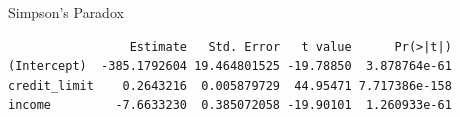 \documentclass[
  ignorenonframetext,
]{beamer}
\newenvironment{Shaded}{\begin{snugshade}}{\end{snugshade}}
\newcommand{\AttributeTok}[1]{\textcolor[rgb]{0.13,0.29,0.53}{#1}}
\newcommand{\FunctionTok}[1]{\textcolor[rgb]{0.13,0.29,0.53}{\textbf{#1}}}
\newcommand{\NormalTok}[1]{#1}
\newcommand{\OtherTok}[1]{\textcolor[rgb]{0.56,0.35,0.01}{#1}}
\newcommand{\SpecialCharTok}[1]{\textcolor[rgb]{0.81,0.36,0.00}{\textbf{#1}}}
\begin{document}
\begin{frame}[fragile]{Simpson's Paradox}
\protect\hypertarget{simpsons-paradox-1}{}
\small

\begin{Shaded}
\end{Shaded}

\begin{verbatim}
                 Estimate   Std. Error   t value      Pr(>|t|)
(Intercept)  -385.1792604 19.464801525 -19.78850  3.878764e-61
credit_limit    0.2643216  0.005879729  44.95471 7.717386e-158
income         -7.6633230  0.385072058 -19.90101  1.260933e-61
\end{verbatim}

\normalsize
\end{frame}
\end{document}

